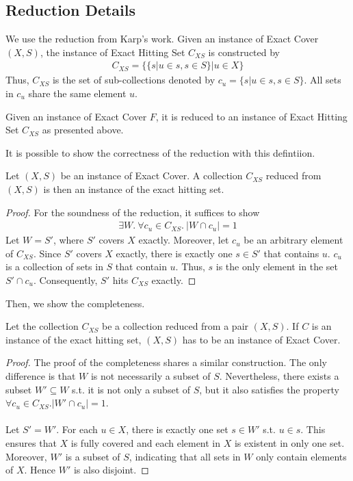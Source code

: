 \subsection{Reduction Details}
We use the reduction from Karp's work. Given an instance of Exact Cover $(X, S)$, the instance of Exact Hitting Set $C_{XS}$ is constructed by 
\begin{align*}
    C_{XS} = \{\{s | u \in s, s \in S \} | u \in X\}
\end{align*}
Thus, $C_{XS}$ is the set of sub-collections denoted by $c_u = \{s | u \in s, s \in S\}$. All sets in $c_u$ share the same element $u$.
\begin{definition}
    Given an instance of Exact Cover $F$, 
    it is reduced to an instance of Exact Hitting Set $C_{XS}$ as presented above.
\end{definition}
It is possible to show the correctness of the reduction with this defintiion.
\begin{lemma}[Soundess]
    Let $(X, S)$ be an instance of Exact Cover. A collection $C_{XS}$ reduced from $(X, S)$ is then an instance of the exact hitting set.
\end{lemma}
\begin{proof}
For the soundness of the reduction, it suffices to show 
\begin{align*}
    \exists W.\ \forall c_u \in C_{XS}.\ |W \cap c_u| = 1
\end{align*}
Let $W = S'$, where $S'$ covers $X$ exactly. Moreover, let $c_u$ be an arbitrary element of $C_{XS}$. 
Since $S'$ covers $X$ exactly, there is exactly one $s \in S'$ that contains $u$. 
$c_u$ is a collection of sets in $S$ that contain $u$.
Thus, $s$ is the only element in the set $S' \cap c_u$. 
Consequently, $S'$ hits $C_{XS}$ exactly.
\end{proof}
Then, we show the completeness.
\begin{lemma}[Completeness]
    Let the collection $C_{XS}$ be a collection reduced from a pair $(X, S)$. If $C$ is an instance of the exact hitting set, 
    $(X, S)$ has to be an instance of Exact Cover.
\end{lemma}
\begin{proof}
The proof of the completeness shares a similar construction. 
The only difference is that $W$ is not necessarily a subset of $S$.
Nevertheless, there exists a subset $W' \subseteq W$ s.t. it is not only a subset of $S$, but it
also satisfies the property $\forall c_u \in C_{XS}. |W' \cap c_u| = 1$. \\\\
Let $S' = W'$. For each $u \in X$, there is exactly one set $s \in W'$ s.t. $u \in s$. 
This ensures that $X$ is fully covered and each element in $X$ is existent in only one set.
Moreover, $W'$ is a subset of $S$, indicating that all sets in $W$ only contain elements of $X$. 
Hence $W'$ is also disjoint.  
\end{proof}
